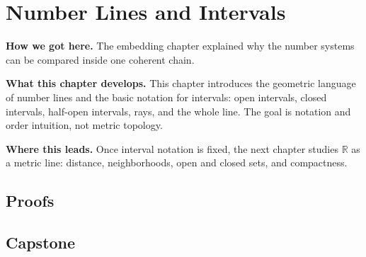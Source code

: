 \chapter{Number Lines and Intervals}
\label{chap:number-lines}


\begin{tcolorbox}[
  colback=gray!6,
  colframe=gray!40,
  arc=2pt,
  left=8pt, right=8pt, top=6pt, bottom=6pt,
  title={\small\textbf{Structural Roadmap}},
  fonttitle=\small\bfseries
]
\noindent\textbf{How we got here.}
The embedding chapter explained why the number systems can be compared inside
one coherent chain.

\medskip
\noindent\textbf{What this chapter develops.}
This chapter introduces the geometric language of number lines and the basic
notation for intervals: open intervals, closed intervals, half-open intervals,
rays, and the whole line. The goal is notation and order intuition, not metric
topology.

\medskip
\noindent\textbf{Where this leads.}
Once interval notation is fixed, the next chapter studies $\mathbb{R}$ as a
metric line: distance, neighborhoods, open and closed sets, and compactness.
\end{tcolorbox}



\section*{Proofs}

\section*{Capstone}

